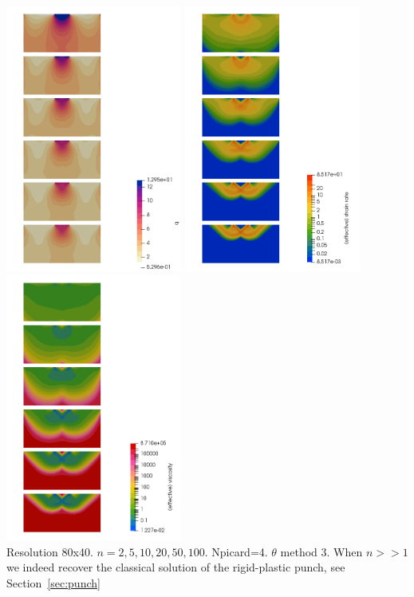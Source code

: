 \begin{center}
\includegraphics[width=5.8cm]{python_codes/fieldstone_87/results/experiment_09/meth3/press}
\includegraphics[width=5.8cm]{python_codes/fieldstone_87/results/experiment_09/meth3/sr}
\includegraphics[width=5.8cm]{python_codes/fieldstone_87/results/experiment_09/meth3/eta}\\
{\captionfont Resolution 80x40. $n=2,5,10,20,50,100$. Npicard=4. 
$\theta$ method 3. When $n>>1$ we indeed recover the 
classical solution of the rigid-plastic punch, see Section~\ref{sec:punch}}
\end{center}


